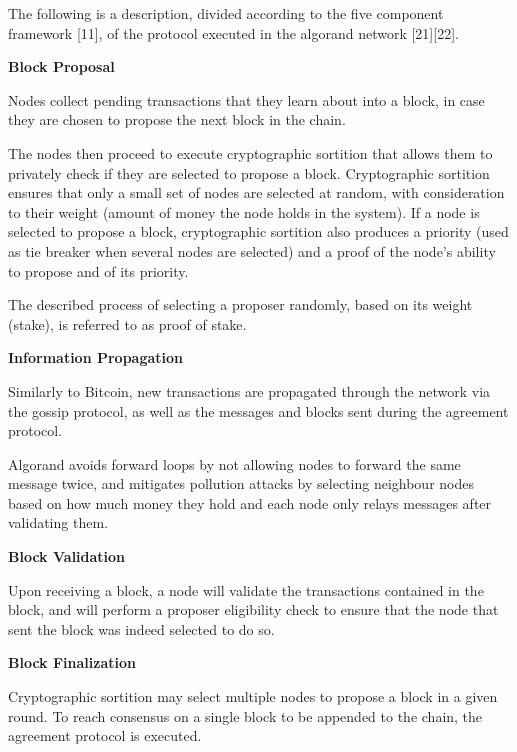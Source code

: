 The following is a description, divided according to the five component framework [11], of the protocol executed in the algorand network [21][22].


\vspace{0.5cm}

\textbf{Block Proposal}

Nodes collect pending transactions that they learn about into a block, in case they are chosen to propose the next block in the chain.

The nodes then proceed to execute cryptographic sortition that allows them to privately check if they are selected to propose a block. Cryptographic sortition ensures that only a small set of nodes are selected at random, with consideration to their weight (amount of money the node holds in the system). If a node is selected to propose a block, cryptographic sortition also produces a priority (used as tie breaker when several nodes are selected) and a proof of the node’s ability to propose and of its priority.

The described process of selecting a proposer randomly, based on its weight (stake), is referred to as proof of stake.


\vspace{0.25cm}


\textbf{Information Propagation}

Similarly to Bitcoin, new transactions are propagated through the network via the gossip protocol, as well as the messages and blocks sent during the agreement protocol.

Algorand avoids forward loops by not allowing nodes to forward the same message twice, and mitigates pollution attacks by selecting neighbour nodes based on how much money they hold and each node only relays messages after validating them.


\vspace{0.25cm}

\textbf{Block Validation}

Upon receiving a block, a node will validate the transactions contained in the block, and will perform a proposer eligibility check to ensure that the node that sent the block was indeed selected to do so.

\vspace{0.25cm}

\textbf{Block Finalization}

Cryptographic sortition may select multiple nodes to propose a block in a given round. To reach consensus on a single block to be appended to the chain, the agreement protocol is executed.

